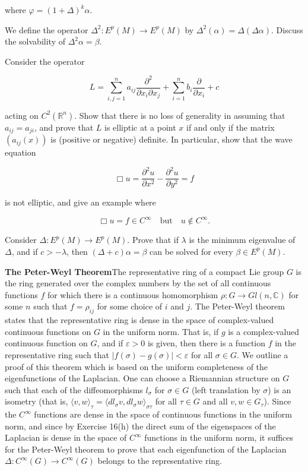 \begin{problemset}
where  $ \varphi = (1 + \Delta)^{k}\alpha $.

\item We define the operator  $ \Delta^2 \colon E^p(M) \to E^p(M) $ by  $ \Delta^2(\alpha) = \Delta(\Delta\alpha) $. Discuss the solvability of  $ \Delta^2\alpha = \beta $.

\item Consider the operator

\[
L=\sum_{i,j=1}^{n}a_{ij}\frac{\partial^{2}}{\partial x_{i}\partial x_{j}}+\sum_{i=1}^{n}b_{i}\frac{\partial}{\partial x_{i}}+c
\]

acting on $C^{2}(\mathbb{R}^{n})$. Show that there is no loss of generality in assuming that $a_{ij}=a_{ji}$, and prove that $L$ is elliptic at a point $x$ if and only if the matrix $(a_{ij}(x))$ is (positive or negative) definite. In particular, show that the wave equation 

\[
\Box u=\frac{\partial^{2}u}{\partial x^{2}}-\frac{\partial^{2}u}{\partial y^{2}}=f
\]

is not elliptic, and give an example where

\[
\Box u=f\in C^{\infty}\quad\text{but}\quad u\notin C^{\infty}.
\]

\item Consider $\Delta\colon E^p(M)\to E^p(M)$. Prove that if $\lambda$ is the minimum eigenvalue of $\Delta$, and if $c>-\lambda$, then $(\Delta+c)\alpha=\beta$ can be solved for every $\beta\in E^p(M)$.

\item \textbf{The Peter-Weyl Theorem}\quad The representative ring of a compact Lie group $G$ is the ring generated over the complex numbers by the set of all continuous functions $f$ for which there is a continuous homomorphism $\rho\colon G \to Gl(n,\mathbb{C})$ for some $n$ such that $f = \rho_{ij}$ for some choice of $i$ and $j$. The Peter-Weyl theorem states that the representative ring is dense in the space of complex-valued continuous functions on $G$ in the uniform norm. That is, if $g$ is a complex-valued continuous function on $G$, and if $\varepsilon > 0$ is given, then there is a function $f$ in the representative ring such that $|f(\sigma) - g(\sigma)| < \varepsilon$ for all $\sigma \in G$. We outline a proof of this theorem which is based on the uniform completeness of the eigenfunctions of the Laplacian. One can choose a Riemannian structure on $G$ such that each of the diffeomorphisms $l_\sigma$ for $\sigma \in G$ (left translation by $\sigma$) is an isometry (that is, $\langle v, w \rangle_\tau = \langle dl_\sigma v, dl_\sigma w \rangle_{\sigma\tau}$ for all $\tau \in G$ and all $v, w \in G_\tau$). Since the $C^\infty$ functions are dense in the space of continuous functions in the uniform norm, and since by Exercise 16(h) the direct sum of the eigenspaces of the Laplacian is dense in the space of $C^\infty$ functions in the uniform norm, it suffices for the Peter-Weyl theorem to prove that each eigenfunction of the Laplacian $\Delta: C^\infty(G) \to C^\infty(G)$ belongs to the representative ring.


\end{problemset}

